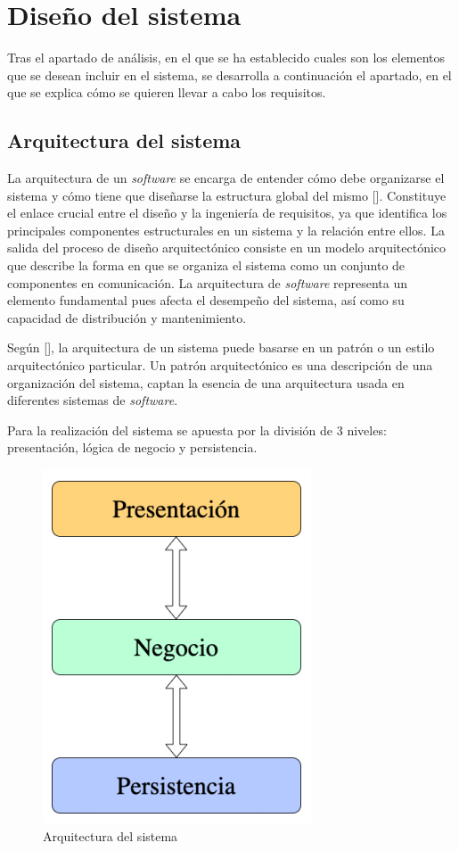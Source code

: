 \section{Diseño del sistema}
Tras el apartado de análisis, en el que se ha establecido cuales son los elementos que se desean incluir en el sistema, se desarrolla a continuación el apartado, en el que se explica cómo se quieren llevar a cabo los requisitos.

\subsection{Arquitectura del sistema}
La arquitectura de un \textit{software} se encarga de entender cómo debe organizarse el sistema y cómo tiene que diseñarse la estructura global del mismo [\cite{91}]. Constituye el enlace crucial entre el diseño y la ingeniería de requisitos, ya que identifica los principales componentes estructurales en un sistema y la relación entre ellos. La salida del proceso de diseño arquitectónico consiste en un modelo arquitectónico que describe la  forma en que se organiza el sistema como un conjunto de componentes en comunicación. La arquitectura de \textit{software} representa un elemento fundamental pues afecta el desempeño del sistema, así como su capacidad de distribución y mantenimiento.

Según [\cite{99}], la arquitectura de un sistema puede basarse en un patrón o un estilo arquitectónico particular. Un patrón arquitectónico es una descripción de una organización del sistema, captan la esencia de una arquitectura usada en diferentes sistemas de \textit{software}.


Para la realización del sistema se apuesta por la división de 3 niveles: presentación, lógica de negocio y persistencia. 

\begin{figure}[htp]
\centering
\includegraphics[scale=0.9]{Graphics/levels}
\caption{Arquitectura del sistema}
\label{fig:3levels}
\end{figure}

